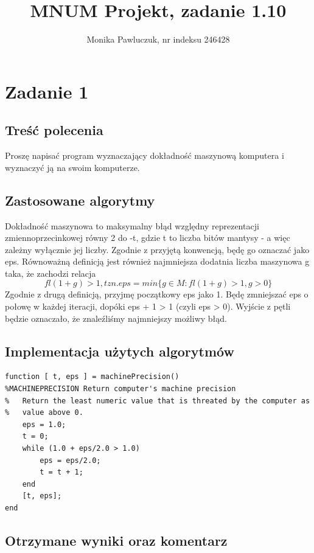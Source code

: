\documentclass[11pt]{article} %
\title{MNUM Projekt, zadanie 1.10}
\author{Monika Pawluczuk, nr indeksu 246428}
\begin{document}
\maketitle

\section{Zadanie 1}

\subsection{Treść polecenia}

Proszę napisać program wyznaczający dokładność maszynową komputera i wyznaczyć ją na swoim komputerze.

\subsection{Zastosowane algorytmy}

Dokładność maszynowa to maksymalny błąd względny reprezentacji zmiennoprzecinkowej równy 2 do -t, gdzie t to liczba bitów mantysy - a więc zależny wyłącznie jej liczby. Zgodnie z przyjętą konwencją, będę go oznaczać jako eps.
Równoważną definicją jest również najmniejsza dodatnia liczba maszynowa g taka, że zachodzi relacja 
\begin{equation}
fl(1 + g) > 1, tzn. eps = min \{  g \in M : fl(1 + g) > 1, g > 0\}
\end{equation}
Zgodnie z drugą definicją, przyjmę początkowy eps jako 1. Będę zmniejszać eps o połowę w każdej iteracji, dopóki eps + 1 > 1 (czyli eps > 0). Wyjście z pętli będzie oznaczało, że znaleźliśmy najmniejszy możliwy błąd.

\subsection{Implementacja użytych algorytmów}

\begin{verbatim}
function [ t, eps ] = machinePrecision()
%MACHINEPRECISION Return computer's machine precision
%   Return the least numeric value that is threated by the computer as
%   value above 0.
    eps = 1.0;
    t = 0;
    while (1.0 + eps/2.0 > 1.0)
        eps = eps/2.0;
        t = t + 1;
    end
    [t, eps];
end

\end{verbatim}

\subsection{Otrzymane wyniki oraz komentarz}
\end{document}
